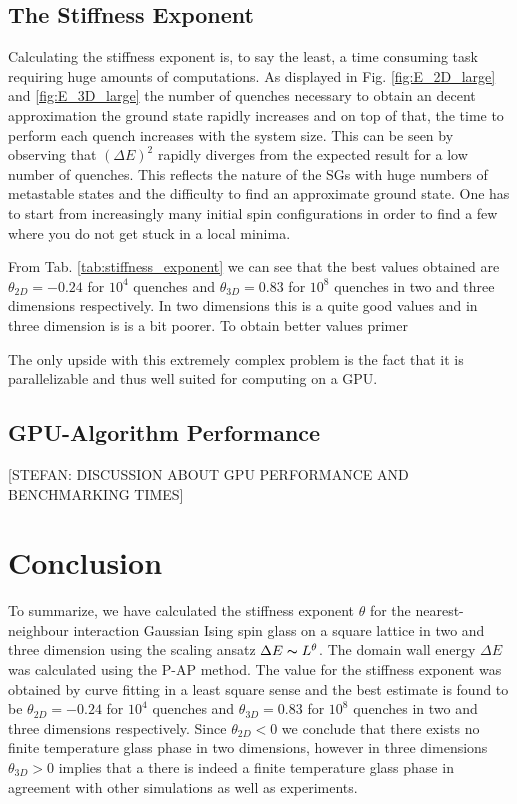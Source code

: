 \documentclass[paper=a4, fontsize=11pt]{scrartcl} %
\numberwithin{equation}{section} %
\numberwithin{figure}{section} %
\numberwithin{table}{section} %
\begin{document}
\subsection{The Stiffness Exponent}
Calculating the stiffness exponent is, to say the least, a time consuming task requiring huge amounts of computations. As displayed in Fig. \ref{fig:E_2D_large} and \ref{fig:E_3D_large} the number of quenches necessary to obtain an decent approximation the ground state rapidly increases and on top of that, the time to perform each quench increases with the system size. This can be seen by observing that $(\Delta E)^2$ rapidly diverges from the expected result for a low number of quenches. This reflects the nature of the SGs with huge numbers of metastable states and the difficulty to find an approximate ground state. One has to start from increasingly many initial spin configurations in order to find a few where you do not get stuck in a local minima. 

From Tab. \ref{tab:stiffness_exponent} we can see that the best values obtained are $\theta_{2D}=-0.24$ for $10^4$ quenches and $\theta_{3D}=0.83$ for $10^8$ quenches in two and three dimensions respectively. In two dimensions this is a quite good values and in three dimension is is a bit poorer. To obtain better values primer 

The only upside with this extremely complex problem is the fact that it is parallelizable and thus well suited for computing on a GPU.

\subsection{GPU-Algorithm Performance}
\label{sec:discussion_gpualgo}
[STEFAN: DISCUSSION ABOUT GPU PERFORMANCE AND BENCHMARKING TIMES]

\section{Conclusion}
To summarize, we have calculated the stiffness exponent $\theta$ for the nearest-neighbour interaction Gaussian Ising spin glass on a square lattice in two and three dimension using the scaling ansatz $\Delta E \thicksim L^\theta$. The domain wall energy $\Delta E$ was calculated using the P-AP method. The value for the stiffness exponent was obtained by curve fitting in a least square sense and the best estimate is found to be $\theta_{2D}=-0.24$ for $10^4$ quenches and $\theta_{3D}=0.83$ for $10^8$ quenches in two and three dimensions respectively. Since $\theta_{2D}<0$ we conclude that there exists no finite temperature glass phase in two dimensions, however in three dimensions $\theta_{3D}>0$ implies that a there is indeed a finite temperature glass phase in agreement with other simulations as well as experiments\cite{hartmann}\cite{fisher}\cite{carter}. 
\end{document}
